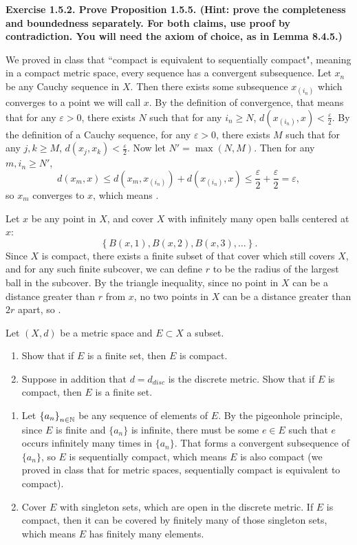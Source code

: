 \documentclass{article}
\begin{document}
\textbf{Exercise 1.5.2. Prove Proposition 1.5.5. (Hint: prove the completeness and boundedness separately. For both claims, use proof by contradiction. You will need the axiom of choice, as in Lemma 8.4.5.)}
\par
We proved in class that ``compact is equivalent to sequentially compact", meaning in a compact metric space, every sequence has a convergent subsequence. Let $x_n$ be any Cauchy sequence in $X$. Then there exists some subsequence $x_{(i_n)}$ which converges to a point we will call $x$. By the definition of convergence, that means that for any $\varepsilon > 0$, there exists $N$ such that for any $i_n \geq N$, $d(x_{(i_n)}, x) < \frac{\varepsilon}{2}$. By the definition of a Cauchy sequence, for any $\varepsilon > 0$, there exists $M$ such that for any $j, k \geq M$, $d(x_j, x_k) < \frac{\varepsilon}{2}$. Now let $N' = \max(N,M)$. Then for any $m, i_n \geq N'$,
\[ d(x_m, x) \leq d(x_m, x_{(i_n)}) + d(x_{(i_n)}, x) \leq \frac{\varepsilon}{2} + \frac{\varepsilon}{2} = \varepsilon, \]
so $x_m$ converges to $x$, which means .
\par
Let $x$ be any point in $X$, and cover $X$ with infinitely many open balls centered at $x$:
\[ \left\{ B(x, 1), B(x, 2), B(x, 3), \dots \right\}. \]
Since $X$ is compact, there exists a finite subset of that cover which still covers $X$, and for any such finite subcover, we can define $r$ to be the radius of the largest ball in the subcover. By the triangle inequality, since no point in $X$ can be a distance greater than $r$ from $x$, no two points in $X$ can be a distance greater than $2r$ apart, so .

\begin{prob}
    Let $(X,d)$ be a metric space and $E \subset X$ a subset.
    \begin{enumerate}[label=(\alph*)]
        \item Show that if $E$ is a finite set, then $E$ is compact.
        \item Suppose in addition that $d=d_{disc}$ is the discrete metric. Show that if $E$ is compact, then $E$ is a finite set.
    \end{enumerate}
\end{prob}
\par
\begin{enumerate}[label=(\alph*)]
    \item Let $ \left\{ a_n \right\}_{n \in \mathbb{N}}$ be any sequence of elements of $E$. By the pigeonhole principle, since $E$ is finite and $ \{a_n\}$ is infinite, there must be some $e \in E$ such that $e$ occurs infinitely many times in $\{a_n\}$. That forms a convergent subsequence of $\{a_n\}$, so $E$ is sequentially compact, which means $E$ is also compact (we proved in class that for metric spaces, sequentially compact is equivalent to compact).
    \item Cover $E$ with singleton sets, which are open in the discrete metric. If $E$ is compact, then it can be covered by finitely many of those singleton sets, which means $E$ has finitely many elements.
\end{enumerate}
\end{document}
